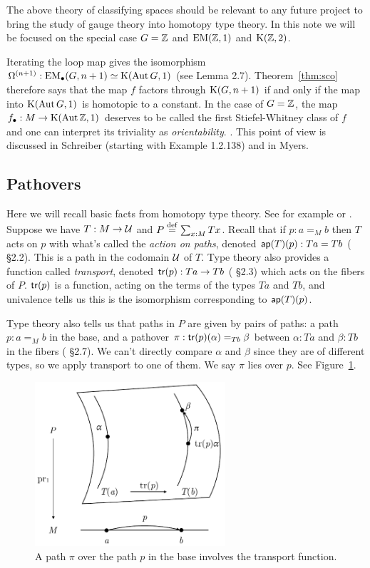 The above theory of classifying spaces should be relevant to any future project to bring the study of gauge theory into homotopy type theory. In this note we will be focused on the special case \( G=\mathbb{Z} \) and \( \mathrm{EM}(\mathbb{Z},1) \) and \( \mathrm{K}(\mathbb{Z},2) \).

\begin{mynote}
Iterating the loop map gives the isomorphism \( \Omega^{(n+1)}:\mathrm{EM_{\bullet}}(G,n+1)\simeq \mathrm{K}(\operatorname{Aut} G,1) \) (see \cite{sco} Lemma 2.7). Theorem~\ref{thm:sco} therefore says that the map \( f \) factors through \( \mathrm{K}(G,n+1) \) if and only if the map into \( \mathrm{K}(\operatorname{Aut} G,1) \) is homotopic to a constant. In the case of \( G=\mathbb{Z} \), the map \( f_\bullet:M\to \mathrm{K}(\operatorname{Aut} \mathbb{Z}, 1) \) deserves to be called the first Stiefel-Whitney class of \( f \) and one can interpret its triviality as \emph{orientability}. . This point of view is discussed in Schreiber\cite{dcct} (starting with Example 1.2.138) and in Myers\cite{myersgood}.
\end{mynote}

\subsection{Pathovers}
\label{sec:pathovers}
Here we will recall basic facts from homotopy type theory. See for example \cite{hottbook} or \cite{egbert}. Suppose we have \( T:M\to\mathcal{U} \) and \( P\stackrel{\mathrm{def}}{=}\sum_{x:M}Tx \). Recall that if \( p:a=_M b \) then \( T \) acts on \( p \) with what's called the \emph{action on paths}, denoted \( \mathsf{ap}(T)(p):Ta=Tb \) (\cite{hottbook} §2.2). This is a path in the codomain \( \mathcal{U} \) of \( T \). Type theory also provides a function called \emph{transport}, denoted \( \mathsf{tr}(p):Ta\to Tb \) (\cite{hottbook} §2.3) which acts on the fibers of \( P \). \( \mathsf{tr}(p) \) is a function, acting on the terms of the types \( Ta \) and \( Tb \), and univalence tells us this is the isomorphism corresponding to \( \mathsf{ap}(T)(p) \).

Type theory also tells us that paths in \( P \) are given by pairs of paths: a path \( p:a=_M b \) in the base, and a pathover \( \pi:\mathsf{tr}(p)(\alpha)=_{Tb}\beta \) between \( \alpha:Ta \) and \( \beta:Tb \) in the fibers (\cite{hottbook} §2.7). We can't directly compare \( \alpha \) and \( \beta \) since they are of different types, so we apply transport to one of them. We say \( \pi \) lies over \( p \). See Figure~\ref{fig:pathovers}.

\begin{figure}[H]
\centering
\includegraphics[width=200pt]{figs/pathovers.pdf}
\caption{A path \( \pi \) over the path \( p \) in the base involves the transport function.}
\label{fig:pathovers}
\end{figure}

